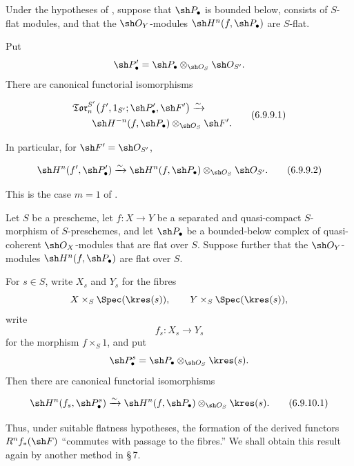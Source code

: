 \begin{corollary}[6.9.9]
\label{III.6.9.9}
Under the hypotheses of , suppose that
$\sh P_\bullet$ is bounded below, consists of $S$-flat modules,
and that the $\sh O_Y$-modules
$\sh H^n(f,\sh P_\bullet)$ are $S$-flat.


Put
\[
  \sh P_\bullet'
  =
  \sh P_\bullet\otimes_{\sh O_S}\sh O_{S'}.
\]
There are canonical functorial isomorphisms
\begin{env}[6.9.9.1]
\label{III.6.9.9.1}
\[
\begin{split}
  &
  \mathfrak{Tor}_n^{S'}
  \bigl(
    f',1_{S'};\sh P_\bullet',\sh F'
  \bigr)
  \xrightarrow{\sim}
  \\
  &\qquad
  \sh H^{-n}(f,\sh P_\bullet)
  \otimes_{\sh O_S}\sh F'.
\end{split}
  \tag{6.9.9.1}\label{III.6.9.9.1.eq}
\]
\end{env}
In particular, for $\sh F'=\sh O_{S'}$,
\begin{env}[6.9.9.2]
\label{III.6.9.9.2}
\[
  \sh H^n(f',\sh P_\bullet')
  \xrightarrow{\sim}
  \sh H^n(f,\sh P_\bullet)
  \otimes_{\sh O_S}\sh O_{S'}.
  \tag{6.9.9.2}\label{III.6.9.9.2.eq}
\]
\end{env}
This is the case $m=1$ of .
\end{corollary}

\begin{corollary}[6.9.10]
\label{III.6.9.10}
Let $S$ be a prescheme, let $f:X\to Y$ be a separated and
quasi-compact $S$-morphism of $S$-preschemes, and let
$\sh P_\bullet$ be a bounded-below complex of quasi-coherent
$\sh O_X$-modules that are flat over $S$.  Suppose further that
the $\sh O_Y$-modules $\sh H^n(f,\sh P_\bullet)$ are flat over
$S$.

For $s\in S$, write $X_s$ and $Y_s$ for the fibres
\[
  X\times_S\Spec(\kres(s)),
  \qquad
  Y\times_S\Spec(\kres(s)),
\]
write
\[
  f_s:X_s\longrightarrow Y_s
\]
for the morphism $f\times_S1$, and put
\[
  \sh P_\bullet^s
  =
  \sh P_\bullet\otimes_{\sh O_S}\kres(s).
\]
Then there are canonical functorial isomorphisms
\begin{env}[6.9.10.1]
\label{III.6.9.10.1}
\[
  \sh H^n(f_s,\sh P_\bullet^s)
  \xrightarrow{\sim}
  \sh H^n(f,\sh P_\bullet)
  \otimes_{\sh O_S}\kres(s).
  \tag{6.9.10.1}\label{III.6.9.10.1.eq}
\]
\end{env}
\end{corollary}

Thus, under suitable flatness hypotheses, the formation of the
derived functors $R^nf_*(\sh F)$ ``commutes with passage to the
fibres.''  We shall obtain this result again by another method in
\S\,7.

